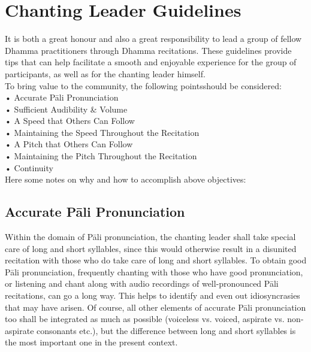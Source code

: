 \chapter{Chanting Leader Guidelines}

It is both a great honour and also a great responsibility to lead a group of fellow Dhamma practitioners through Dhamma recitations. These guidelines provide tips that can help facilitate a smooth and enjoyable experience for the group of participants, as well as for the chanting leader himself.\\

To bring value to the community, the following pointsshould be considered:\\
• Accurate Pāli Pronunciation\\
• Sufficient Audibility \& Volume\\
• A Speed that Others Can Follow\\
• Maintaining the Speed Throughout the Recitation\\
• A Pitch that Others Can Follow\\
• Maintaining the Pitch Throughout the Recitation\\
• Continuity\\
Here some notes on why and how to accomplish above objectives:\\

\section{Accurate Pāli Pronunciation}
Within the domain of Pāli pronunciation, the chanting leader shall take special care of long and short syllables, since this would otherwise result in a disunited recitation with those who do take care of long and short syllables. To obtain good Pāli pronunciation, frequently chanting with those who have good pronunciation, or listening and chant along with audio recordings of well-pronounced Pāli recitations, can go a long way. This helps to identify and even out idiosyncrasies that may have arisen. Of course, all other elements of accurate Pāli pronunciation too shall be integrated as much as possible (voiceless vs. voiced, aspirate vs. non-aspirate consonants etc.), but the difference between long and short syllables is the most important one in the present context.\\

